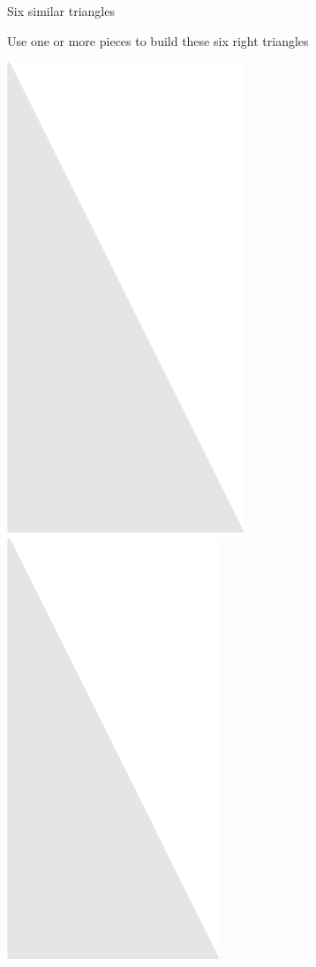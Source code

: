 \documentclass[14pt]{beamer}
\begin{document}
    \begin{frame}{Six similar triangles}
        \begin{center}
            Use one or more pieces to build these six right triangles

            \bigskip\bigskip
            
            \includegraphics[scale=0.35]{figures/figure024f.pdf}\quad
            \includegraphics[scale=0.35]{figures/figure024e.pdf}\quad

\end{center}
\end{frame}
\end{document}
